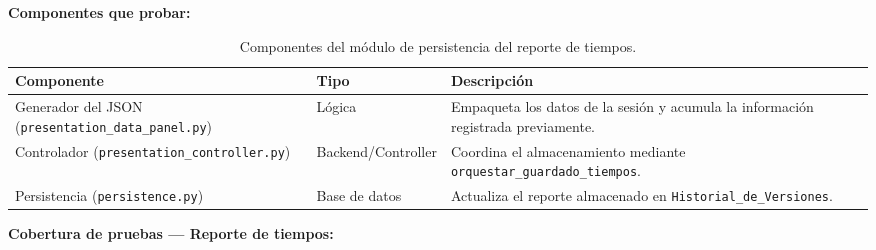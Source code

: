\documentclass[12pt,letterpaper]{article}
\begin{document}
\textbf{Componentes que probar:}

\begin{table}[H]
    \centering
    \begin{tabular}{|L{0.34\textwidth}|L{0.18\textwidth}|L{0.38\textwidth}|}
        \hline
        \textbf{Componente} & \textbf{Tipo} & \textbf{Descripción} \\ \hline
        Generador del JSON (\texttt{presentation\_data\_panel.py}) & Lógica & Empaqueta los datos de la sesión y acumula la información registrada previamente. \\ \hline
        Controlador (\texttt{presentation\_controller.py}) & Backend/Controller & Coordina el almacenamiento mediante \texttt{orquestar\_guardado\_tiempos}. \\ \hline
        Persistencia (\texttt{persistence.py}) & Base de datos & Actualiza el reporte almacenado en \texttt{Historial\_de\_Versiones}. \\ \hline
    \end{tabular}
    \caption{Componentes del módulo de persistencia del reporte de tiempos.}
    \label{tab:componentes-modulo-reporte}
\end{table}

\textbf{Cobertura de pruebas --- Reporte de tiempos:}
\end{document}
